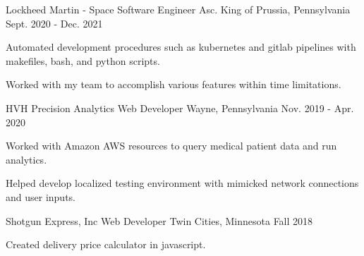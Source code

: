\begin{cventries}
  \cventry
    {Lockheed Martin - Space} %
    {Software Engineer Asc.} %
    {King of Prussia, Pennsylvania} %
    {Sept. 2020 - Dec. 2021} %
    {
      \begin{cvitems} %
        \item {Automated development procedures such as kubernetes and gitlab pipelines with makefiles, bash, and python scripts.}
        \item {Worked with my team to accomplish various features within time limitations.}
      \end{cvitems}
    }

  \cventry
    {HVH Precision Analytics} %
    {Web Developer} %
    {Wayne, Pennsylvania} %
    {Nov. 2019 - Apr. 2020} %
    {
      \begin{cvitems} %
        \item {Worked with Amazon AWS resources to query medical patient data and run analytics.}
        \item {Helped develop localized testing environment with mimicked network connections and user inputs.}
      \end{cvitems}
    }


  \cventry
    {Shotgun Express, Inc}
    {Web Developer}
    {Twin Cities, Minnesota} %
    {Fall 2018} %
    {
      \begin{cvitems} %
        \item {Created delivery price calculator in javascript.}
      \end{cvitems}
    }


\end{cventries}
